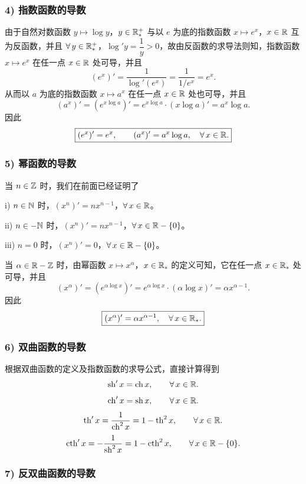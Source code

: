 \subsubsection*{4) 指数函数的导数}

由于自然对数函数 \(y\longmapsto\log y\)，\(y\in\mathbb{R}_*^+\) 与以 \(e\) 为底的指数函数 \(x\longmapsto e^x\)，\(x\in\mathbb{R}\) 互为反函数，并且 \(\forall\,y\in\mathbb{R}_*^+\)，\(\log'y=\dfrac1y>0\)，故由反函数的求导法则知，指数函数 \(x\longmapsto e^x\) 在任一点 \(x\in\mathbb{R}\) 处可导，并且
\[
(e^x)'=\frac1{\log'(e^x)}=\frac1{1/e^x}=e^x.
\]
从而以 \(a\) 为底的指数函数 \(x\longmapsto a^x\) 在任一点 \(x\in\mathbb{R}\) 处也可导，并且
\[
(a^x)'=(e^{x\log a})'=e^{x\log a}\cdot(x\log a)'=a^x\log a.
\]
因此
\[
\boxed{(e^x)'=e^x,\qquad(a^x)'=a^x\log a,\quad\forall\,x\in\mathbb{R}.}
\]

\subsubsection*{5) 幂函数的导数}

当 \(n\in\mathbb{Z}\) 时，我们在前面已经证明了

i) \(n\in\mathbb{N}\) 时，\((x^n)'=nx^{n-1}\)，\(\forall\,x\in\mathbb{R}\)。

ii) \(n\in-\mathbb{N}\) 时，\((x^n)'=nx^{n-1}\)，\(\forall\,x\in\mathbb{R}-\{0\}\)。

iii) \(n=0\) 时，\((x^n)'=0\)，\(\forall\,x\in\mathbb{R}-\{0\}\)。

当 \(\alpha\in\mathbb{R}-\mathbb{Z}\) 时，由幂函数 \(x\longmapsto x^\alpha\)，\(x\in\mathbb{R}_*\) 的定义可知，它在任一点 \(x\in\mathbb{R}_*\) 处可导，并且
\[
(x^\alpha)'=(e^{\alpha\log x})'=e^{\alpha\log x}\cdot(\alpha\log x)'=\alpha x^{\alpha-1}.
\]
因此
\[
\boxed{(x^\alpha)'=\alpha x^{\alpha-1},\quad\forall\,x\in\mathbb{R}_*.}
\]

\subsubsection*{6) 双曲函数的导数}

根据双曲函数的定义及指数函数的求导公式，直接计算得到
\[
\operatorname{sh}'x=\operatorname{ch}x,\qquad\forall\,x\in\mathbb{R}.
\]
\[
\operatorname{ch}'x=\operatorname{sh}x,\qquad\forall\,x\in\mathbb{R}.
\]
\[
\operatorname{th}'x=\frac1{\operatorname{ch}^2x}=1-\operatorname{th}^2x,\qquad\forall\,x\in\mathbb{R}.
\]
\[
\operatorname{cth}'x=-\frac1{\operatorname{sh}^2x}=1-\operatorname{cth}^2x,\qquad\forall\,x\in\mathbb{R}-\{0\}.
\]

\subsubsection*{7) 反双曲函数的导数}


